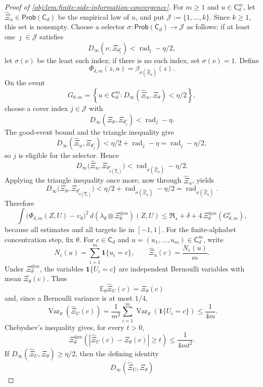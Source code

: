 \documentclass[11pt]{article}
\begin{document}
\begin{proof}[Proof of \cref{obj:lem:finite-side-information-convergence}]
For \(m\ge1\) and \(u\in\mathsf C_d^m\), let \(\widehat\Xi_u\in\mathsf{Prob}(\mathsf C_d)\) be the
empirical law of \(u\), and put \(\mathcal J:=\{1,\ldots,k\}\). Since \(k\ge1\), this set is
nonempty. Choose a selector \(\sigma:\mathsf{Prob}(\mathsf C_d)\to\mathcal J\) as follows: if at
least one \(\jmath\in\mathcal J\) satisfies
\[
D_\infty(\nu,\Xi_{\theta^\circ_{\jmath}})
<
\operatorname{rad}_{\jmath}-\eta/2,
\]
let \(\sigma(\nu)\) be the least such index; if there is no such index, set
\(\sigma(\nu)=1\). Define
\[
\Phi_{\delta,m}(z,u)=\beta_{\sigma(\widehat\Xi_u)}(z).
\]
On the event
\[
G_{\theta,m}
=
\left\{
u\in\mathsf C_d^m:
D_\infty(\widehat\Xi_u,\Xi_\theta)<\eta/2
\right\},
\]
choose a cover index \(j\in\mathcal J\) with
\[
D_\infty(\Xi_\theta,\Xi_{\theta_j^\circ})
<\operatorname{rad}_j-\eta.
\]
The good-event bound and the triangle inequality give
\[
D_\infty(\widehat\Xi_u,\Xi_{\theta_j^\circ})
<\eta/2+\operatorname{rad}_j-\eta
=\operatorname{rad}_j-\eta/2,
\]
so \(j\) is eligible for the selector. Hence
\[
D_\infty\bigl(\widehat\Xi_u,
\Xi_{\theta^\circ_{\sigma(\widehat\Xi_u)}}\bigr)
<\operatorname{rad}_{\sigma(\widehat\Xi_u)}-\eta/2.
\]
Applying the triangle inequality once more, now through \(\widehat\Xi_u\), yields
\[
D_\infty\bigl(\Xi_\theta,\Xi_{\theta^\circ_{\sigma(\widehat\Xi_u)}}\bigr)
<
\eta/2+\operatorname{rad}_{\sigma(\widehat\Xi_u)}-\eta/2
=
\operatorname{rad}_{\sigma(\widehat\Xi_u)}.
\]
Therefore
\[
\int
\bigl(\Phi_{\delta,m}(Z,U)-\upsilon_\theta\bigr)^2\,
d(\lambda_\theta\otimes\Xi_\theta^{\otimes m})(Z,U)
\le
\mathfrak R_\star+\delta
+
4\,\Xi_\theta^{\otimes m}(G_{\theta,m}^{c}),
\]
because all estimates and all targets lie in \([-1,1]\). For the finite-alphabet concentration step, fix \(\theta\). For \(c\in\mathsf C_d\) and
\(u=(u_1,\ldots,u_m)\in\mathsf C_d^m\), write
\[
N_c(u)=\sum_{i=1}^m\mathbf 1\{u_i=c\},
\qquad
\widehat\Xi_u(c)=\frac{N_c(u)}m .
\]
Under \(\Xi_\theta^{\otimes m}\), the variables \(\mathbf 1\{U_i=c\}\) are independent Bernoulli variables with mean \(\Xi_\theta(c)\). Thus
\[
\mathbb E_\theta\widehat\Xi_U(c)=\Xi_\theta(c)
\]
and, since a Bernoulli variance is at most \(1/4\),
\[
\operatorname{Var}_\theta\!\left(\widehat\Xi_U(c)\right)
=
\frac{1}{m^2}\sum_{i=1}^m
\operatorname{Var}_\theta\!\left(\mathbf 1\{U_i=c\}\right)
\le
\frac{1}{4m} .
\]
Chebyshev's inequality gives, for every \(t>0\),
\[
\Xi_\theta^{\otimes m}\left(
\left|\widehat\Xi_U(c)-\Xi_\theta(c)\right|
\ge t
\right)
\le
\frac{1}{4mt^2} .
\]
If \(D_\infty(\widehat\Xi_U,\Xi_\theta)\ge\eta/2\), then the defining identity
\[
D_\infty(\widehat\Xi_U,\Xi_\theta)
\]
\end{proof}
\end{document}
